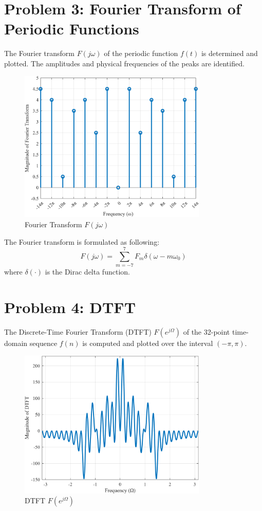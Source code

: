 \documentclass[12pt]{article}
\begin{document}
\newpage
\section*{Problem 3: Fourier Transform of Periodic Functions}
The Fourier transform $F(j\omega)$ of the periodic function $f(t)$ is determined and plotted. The amplitudes and physical frequencies of the peaks are identified.

\begin{figure}[H]
    \centering
    \includegraphics[width=0.8\textwidth]{F_j_omega.png}
    \caption{Fourier Transform $F(j\omega)$}
\end{figure}

The Fourier transform is formulated as following:
\[
F(j\omega) = \sum_{m=-7}^{7} F_m \delta(\omega - m \omega_0) \]
where $\delta(\cdot)$ is the Dirac delta function. 

\newpage
\section*{Problem 4: DTFT}
The Discrete-Time Fourier Transform (DTFT) $F(e^{j\Omega})$ of the 32-point time-domain sequence $f(n)$ is computed and plotted over the interval $(-\pi, \pi)$.

\begin{figure}[H]
    \centering
    \includegraphics[width=0.8\textwidth]{F_Omega.png}
    \caption{DTFT $F(e^{j\Omega})$}
\end{figure}
\end{document}
